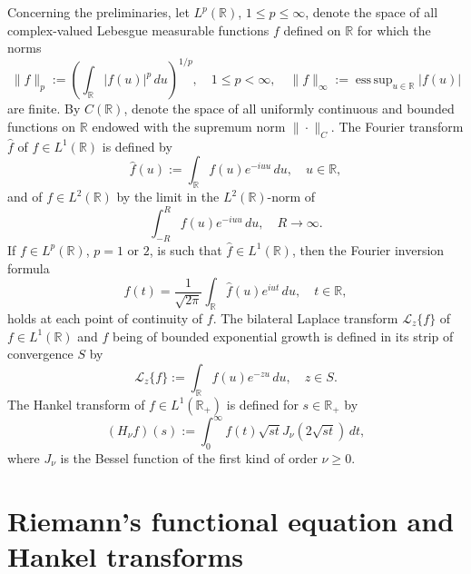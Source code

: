 \documentclass[11pt]{article}
\theoremstyle{plain}
\begin{document}
Concerning the preliminaries, let $L^p(\mathbb{R})$, $1 \leq p \leq \infty$, denote the space of all complex-valued Lebesgue measurable functions $f$ defined on $\mathbb{R}$ for which the norms
\begin{equation}
\|f\|_p := \left(\int_{\mathbb{R}} |f(u)|^p \, du\right)^{1/p}, \quad 1 \leq p < \infty, \quad \|f\|_\infty := \operatorname{ess\,sup}_{u \in \mathbb{R}} |f(u)|
\label{eq:lp_norm}
\end{equation}
are finite. By $C(\mathbb{R})$, denote the space of all uniformly continuous and bounded functions on $\mathbb{R}$ endowed with the supremum norm $\|\cdot\|_C$. The Fourier transform $\hat{f}$ of $f \in L^1(\mathbb{R})$ is defined by
\begin{equation}
\hat{f}(u) := \int_{\mathbb{R}} f(u) e^{-i u u} \, du, \quad u \in \mathbb{R},
\label{eq:fourier_transform}
\end{equation}
and of $f \in L^2(\mathbb{R})$ by the limit in the $L^2(\mathbb{R})$-norm of
\begin{equation}
\int_{-R}^{R} f(u) e^{-i u u} \, du, \quad R \to \infty.
\label{eq:fourier_l2}
\end{equation}
If $f \in L^p(\mathbb{R})$, $p = 1$ or $2$, is such that $\hat{f} \in L^1(\mathbb{R})$, then the Fourier inversion formula
\begin{equation}
f(t) = \frac{1}{\sqrt{2\pi}} \int_{\mathbb{R}} \hat{f}(u) e^{i u t} \, du, \quad t \in \mathbb{R},
\label{eq:fourier_inversion}
\end{equation}
holds at each point of continuity of $f$. The bilateral Laplace transform $\mathcal{L}_z\{f\}$ of $f \in L^1(\mathbb{R})$ and $f$ being of bounded exponential growth is defined in its strip of convergence $S$ by
\begin{equation}
\mathcal{L}_z\{f\} := \int_{\mathbb{R}} f(u) e^{-zu} \, du, \quad z \in S.
\label{eq:laplace_transform}
\end{equation}
The Hankel transform of $f \in L^1(\mathbb{R}_+)$ is defined for $s \in \mathbb{R}_+$ by
\begin{equation}
(H_\nu f)(s) := \int_0^\infty f(t) \sqrt{st} J_\nu(2\sqrt{st}) \, dt,
\label{eq:hankel_transform}
\end{equation}
where $J_\nu$ is the Bessel function of the first kind of order $\nu \geq 0$.

\section{Riemann's functional equation and Hankel transforms}
\label{sec:riemann}
\end{document}
